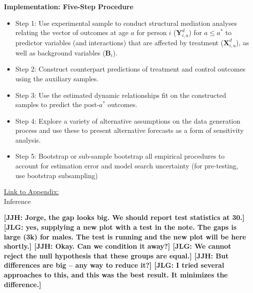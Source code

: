 \documentclass[static]{JJH-Beamer}
\begin{document}
\begin{frame}

\begin{center}
\textbf{Implementation: Five-Step Procedure}
\end{center}

\begin{itemize}
\item Step 1: Use experimental sample to conduct structural mediation analyses relating the vector of outcomes at age $a$ for person $i$ ($\bm{Y}^{d}_{i,a}$) for $a\leq a^*$ to predictor variables (and interactions) that are affected by treatment ($\bm{X}^{d}_{i,a}$), as well as background variables ($\bm{B}_i$).
\item Step 2: Construct counterpart predictions of treatment and control outcomes using the auxiliary samples.
\item Step 3: Use the estimated dynamic relationships fit on the constructed samples to predict the post-$a^{\ast}$ outcomes.
\item Step 4: Explore a variety of alternative assumptions on the data generation process and use these to present alternative forecasts as a form of sensitivity analysis.
\item Step 5: Bootstrap or sub-sample bootstrap all empirical procedures to account for estimation error and model search uncertainty (for pre-testing, use bootstrap subsampling)
\end{itemize}

\end{frame}

\begin{frame}

\hypertarget{ret:fruitypebbles}{}
\begin{center}
\hyperlink{fruitypebbles}{\underline{Link to Appendix:}}\\
Inference
\end{center}

\end{frame}

\clearpage

\textbf{[JJH: Jorge, the gap looks big. We should report test statistics at 30.] [JLG: yes, supplying a new plot with a test in the note. The gaps is large (3k) for males. The test is running and the new plot will be here shortly.] [JJH: Okay. Can we condition it away?] [JLG: We cannot reject the null hypothesis that these groups are equal.] [JJH: But differences are big -- any way to reduce it?] [JLG: I tried several approaches to this, and this was the best result. It minimizes the difference.]}
\end{document}
